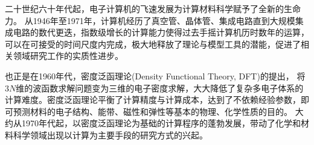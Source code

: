


二十世纪六十年代起，电子计算机的飞速发展为计算材料科学赋予了全新的生命力。%
从1946年至1971年，计算机经历了真空管、晶体管、集成电路直到大规模集成电路的数代更迭，指数级增长的计算能力使得过去手摇计算机历时数年的运算，可以在可接受的时间尺度内完成，极大地释放了理论与模型工具的潜能，促进了相关领域研究工作的实质性进步。

也正是在1960年代，密度泛函理论\textrm{(Density Functional Theory, DFT)}的提出，%
将$3N$维的波函数求解问题变为三维的电子密度求解，大大降低了复杂多电子体系的计算难度。密度泛函理论平衡了计算精度与计算成本，达到了不依赖经验参数，即可预测材料的电子结构、能带、磁性和弹性等基本的物理、化学性质的目的。
大约从1970年代起，以密度泛函理论为基础的计算程序的蓬勃发展，带动了化学和材料科学领域出现以计算为主要手段的研究方式的兴起。%

